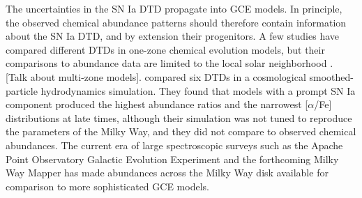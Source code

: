 \documentclass[twocolumn,twocolappendix,linenumbers,trackchanges]{aastex631}
\newcommand{\aFe}{[$\alpha$/Fe]\xspace}
\begin{document}

The uncertainties in the SN Ia DTD propagate into GCE models. In principle, the observed chemical abundance patterns should therefore contain information about the SN Ia DTD, and by extension their progenitors.
A few studies have compared different DTDs in one-zone chemical evolution models, but their comparisons to abundance data are limited to the local solar neighborhood \citep[e.g.,][]{Andrews2017-ChemicalEvolution,Palicio2023-AnalyticDTD}. 
[Talk about \citep{Matteucci2009-DTDModels} multi-zone models].
\citet{Poulhazan2018-PrecisionPollution} compared six DTDs in a cosmological smoothed-particle hydrodynamics simulation. They found that models with a prompt SN Ia component produced the highest abundance ratios and the narrowest \aFe distributions at late times, although their simulation was not tuned to reproduce the parameters of the Milky Way, and they did not compare to observed chemical abundances. 
The current era of large spectroscopic surveys such as the Apache Point Observatory Galactic Evolution Experiment \citep[APOGEE;][]{Majewski2017-APOGEE} and the forthcoming Milky Way Mapper \citep{Kollmeier2017-SDSS-V} has made abundances across the Milky Way disk available for comparison to more sophisticated GCE models.
\end{document}
